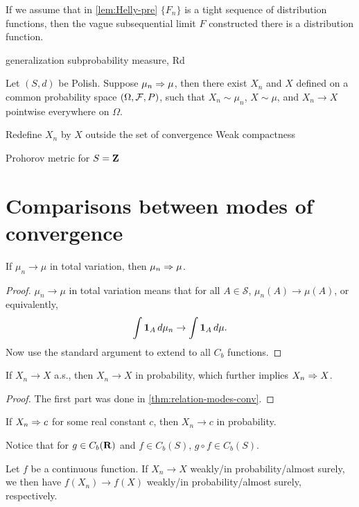 \begin{namedthm}
    If we assume that in \cref{lem:Helly-pre} $\{F_n\}$ is a tight sequence of distribution functions, then the vague subsequential limit $F$ constructed there is a distribution function.
\end{namedthm}

generalization subprobability measure, Rd

\begin{namedthm}
    Let $(S,d)$ be Polish. Suppose $\mu_n \Rightarrow \mu$, then there exist $X_n$ and $X$ defined on a common probability space $(\Omega,\mathcal{F},P)$, such that $X_n \sim \mu_n$, $X\sim \mu$, and $X_n \to X$ pointwise everywhere on $\Omega$.
\end{namedthm}

Redefine $X_n$ by $X$ outside the set of convergence
Weak compactness

Prohorov metric for $S = \mathbf{Z}$


\section{Comparisons between modes of convergence}
\begin{thm}
    If $\mu_n \to \mu$ in total variation, then $\mu_n \Rightarrow \mu$.
\end{thm}
\begin{proof}
    $\mu_n \to \mu$ in total variation means that for all $A \in \mathcal S$, $\mu_n(A) \to \mu(A)$, or equivalently, \[
        \int \mathbf{1}_A \,d \mu_n \to \int \mathbf{1}_A\, d\mu.
    \] Now use the standard argument to extend to all $C_b$ functions.
\end{proof}

\begin{thm}
    If $X_n \to X$ a.s., then $X_n \to X$ in probability, which further implies $X_n \Rightarrow X$.
\end{thm}
\begin{proof}
    The first part was done in \cref{thm:relation-modes-conv}. 
\end{proof}

\begin{thm}
    If $X_n \Rightarrow c$ for some real constant $c$, then $X_n \to c$ in probability.
\end{thm}

Notice that for $g \in C_b(\mathbf{R})$ and $f \in C_b(S)$, $g\circ f\in C_b(S)$.

\begin{namedthm} Let $f$ be a continuous function. If $X_n \to X$ weakly/in probability/almost surely, we then have $f(X_n) \to f(X)$ weakly/in probability/almost surely, respectively.
\end{namedthm}

